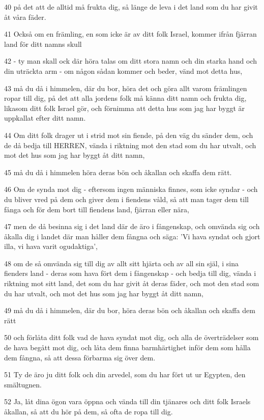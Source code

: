\par 40 på det att de alltid må frukta dig, så länge de leva i det land som du har givit åt våra fäder.
\par 41 Också om en främling, en som icke är av ditt folk Israel, kommer ifrån fjärran land för ditt namns skull
\par 42 - ty man skall ock där höra talas om ditt stora namn och din starka hand och din uträckta arm - om någon sådan kommer och beder, vänd mot detta hus,
\par 43 må du då i himmelen, där du bor, höra det och göra allt varom främlingen ropar till dig, på det att alla jordens folk må känna ditt namn och frukta dig, likasom ditt folk Israel gör, och förnimma att detta hus som jag har byggt är uppkallat efter ditt namn.
\par 44 Om ditt folk drager ut i strid mot sin fiende, på den väg du sänder dem, och de då bedja till HERREN, vända i riktning mot den stad som du har utvalt, och mot det hus som jag har byggt åt ditt namn,
\par 45 må du då i himmelen höra deras bön och åkallan och skaffa dem rätt.
\par 46 Om de synda mot dig - eftersom ingen människa finnes, som icke syndar - och du bliver vred på dem och giver dem i fiendens våld, så att man tager dem till fånga och för dem bort till fiendens land, fjärran eller nära,
\par 47 men de då besinna sig i det land där de äro i fångenskap, och omvända sig och åkalla dig i landet där man håller dem fångna och säga: 'Vi hava syndat och gjort illa, vi hava varit ogudaktiga',
\par 48 om de så omvända sig till dig av allt sitt hjärta och av all sin själ, i sina fienders land - deras som hava fört dem i fångenskap - och bedja till dig, vända i riktning mot sitt land, det som du har givit åt deras fäder, och mot den stad som du har utvalt, och mot det hus som jag har byggt åt ditt namn,
\par 49 må du då i himmelen, där du bor, höra deras bön och åkallan och skaffa dem rätt
\par 50 och förlåta ditt folk vad de hava syndat mot dig, och alla de överträdelser som de hava begått mot dig, och låta dem finna barmhärtighet inför dem som hålla dem fångna, så att dessa förbarma sig över dem.
\par 51 Ty de äro ju ditt folk och din arvedel, som du har fört ut ur Egypten, den smältugnen.
\par 52 Ja, låt dina ögon vara öppna och vända till din tjänares och ditt folk Israels åkallan, så att du hör på dem, så ofta de ropa till dig.
